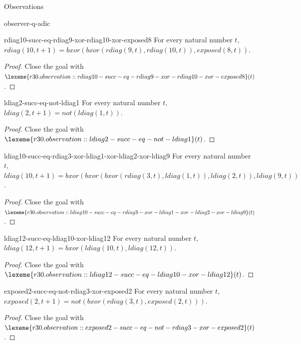\begin{lexlean}{Observations}
\begin{section}{observer-q-adic}
\begin{theorem}{rdiag10-succ-eq-rdiag9-xor-rdiag10-xor-exposed8}
For every natural number \(t\), \(rdiag(10, t + 1) = bxor(bxor(rdiag(9, t), rdiag(10, t)), exposed(8, t))\).
\begin{proof}
Close the goal with \(\lexeme{r30.observation::rdiag10-succ-eq-rdiag9-xor-rdiag10-xor-exposed8}(t)\).
\end{proof}
\end{theorem}

\begin{theorem}{ldiag2-succ-eq-not-ldiag1}
For every natural number \(t\), \(ldiag(2, t + 1) = not(ldiag(1, t))\).
\begin{proof}
Close the goal with \(\lexeme{r30.observation::ldiag2-succ-eq-not-ldiag1}(t)\).
\end{proof}
\end{theorem}

\begin{theorem}{ldiag10-succ-eq-rdiag3-xor-ldiag1-xor-ldiag2-xor-ldiag9}
For every natural number \(t\), \(ldiag(10, t + 1) = bxor(bxor(bxor(rdiag(3, t), ldiag(1, t)), ldiag(2, t)), ldiag(9, t))\).
\begin{proof}
Close the goal with \(\lexeme{r30.observation::ldiag10-succ-eq-rdiag3-xor-ldiag1-xor-ldiag2-xor-ldiag9}(t)\).
\end{proof}
\end{theorem}

\begin{theorem}{ldiag12-succ-eq-ldiag10-xor-ldiag12}
For every natural number \(t\), \(ldiag(12, t + 1) = bxor(ldiag(10, t), ldiag(12, t))\).
\begin{proof}
Close the goal with \(\lexeme{r30.observation::ldiag12-succ-eq-ldiag10-xor-ldiag12}(t)\).
\end{proof}
\end{theorem}

\begin{theorem}{exposed2-succ-eq-not-rdiag3-xor-exposed2}
For every natural number \(t\), \(exposed(2, t + 1) = not(bxor(rdiag(3, t), exposed(2, t)))\).
\begin{proof}
Close the goal with \(\lexeme{r30.observation::exposed2-succ-eq-not-rdiag3-xor-exposed2}(t)\).
\end{proof}
\end{theorem}


\end{section}
\end{lexlean}
